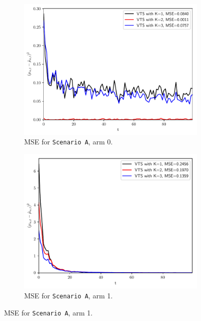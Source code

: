 \documentclass{article}
\begin{document}
\begin{figure}[!h]
	\centering
	\begin{subfigure}[b]{0.49\textwidth}
		\includegraphics[width=\textwidth]{./figs/model_a_mse_arm_0.pdf}
		\caption{MSE for \texttt{Scenario A}, arm 0.}
		\label{fig:model_a_mse_arm_0}
	\end{subfigure}
	\begin{subfigure}[b]{0.49\textwidth}
		\includegraphics[width=\textwidth]{./figs/model_a_mse_arm_1.pdf}
		\caption{MSE for \texttt{Scenario A}, arm 1.}
		\label{fig:model_a_mse_arm_1}
	\end{subfigure}
	

\end{figure}
\end{document}
